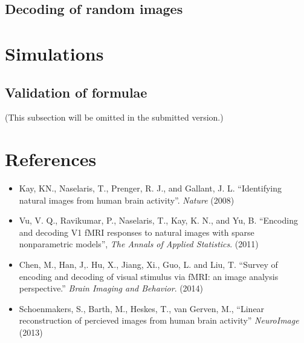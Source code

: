 \documentclass[11pt]{article}
\begin{document}
\subsection{Decoding of random images}

\section{Simulations}

\subsection{Validation of formulae}

(This subsection will be omitted in the submitted version.)

\section{References}

\begin{itemize}
\item Kay, KN., Naselaris, T., Prenger, R. J., and Gallant, J. L.
  ``Identifying natural images from human brain
  activity''. \emph{Nature} (2008)
\item Vu, V. Q., Ravikumar, P., Naselaris, T., Kay, K. N., and Yu, B.
  ``Encoding and decoding V1 fMRI responses to natural images with
  sparse nonparametric models'', \emph{The Annals of Applied
    Statistics}. (2011)
\item Chen, M., Han, J,. Hu, X., Jiang, Xi., Guo, L. and Liu, T.
  ``Survey of encoding and decoding of visual stimulus via fMRI: an
  image analysis perspective.'' \emph{Brain Imaging and
    Behavior}. (2014)
\item Schoenmakers, S., Barth, M., Heskes, T., van Gerven, M.,
  ``Linear reconstruction of percieved images from human brain
  activity'' \emph{NeuroImage} (2013)
\end{itemize}
\end{document}
